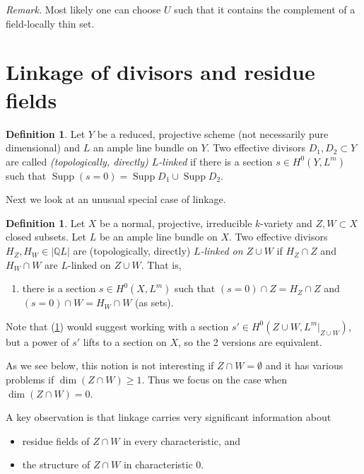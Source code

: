 \documentclass{amsart}
\theoremstyle{definition}
\newtheorem{defn}[thm]{Definition}
\theoremstyle{remark}
\newcommand{\q}[0]{{\mathbb Q}}
\newcommand{\supp}[0]{\operatorname{Supp}}
\begin{document}
{\it Remark.} Most likely one can choose  
$U$ such that it  contains the complement of a field-locally thin set. 
\medskip













\section{Linkage of divisors and residue fields}\label{link.divs.res.sect}



\begin{defn}\label{t-link.gen.defn} Let $Y$ be a reduced, projective scheme (not necessarily pure dimensional) and $L$ an ample line bundle on $Y$.  
Two effective divisors $D_1, D_2\subset Y$ are called  {\it (topologically, directly)  $L$-linked} if there is a section $s\in H^0(Y, L^m)$ such that
$\supp (s=0)=\supp D_1\cup \supp D_2$. 
\end{defn}

Next we look at an unusual special case of linkage.


\begin{defn}  \label{t-link.ZW.defn}
Let $X$ be a  normal, projective, irreducible  $k$-variety and
$Z, W\subset X$ closed subsets. Let $L$ be an ample line bundle on $X$. Two effective divisors  $H_Z, H_W\in |\q L|$ are (topologically, directly)  {\it $L$-linked on $Z\cup W$} if  $H_Z\cap Z$ and $H_W\cap W$
are  $L$-linked on $Z\cup W$. That is, 
\begin{enumerate}
\item there is a section $s\in H^0(X, L^m)$ such that
$(s=0)\cap Z=H_Z\cap Z$ and $(s=0)\cap W=H_W\cap W$ (as sets).
\end{enumerate}
Note that (\ref{t-link.gen.defn}) would suggest working with a section
$s'\in H^0(Z\cup W, L^m|_{Z\cup W})$, but a power of $s'$ lifts to a section on $X$, so the 2 versions are equivalent.

As we see below, this notion is not interesting if $Z\cap W=\emptyset$
and it has various problems if $\dim (Z\cap W)\geq 1$. Thus we focus on the case when  $\dim (Z\cap W)=0$.





A key observation is that linkage  carries very significant information about \begin{itemize}
\item  residue fields of  $Z\cap W$ in every characteristic, and 
\item the structure of $Z\cap W$ in characteristic 0. 
\end{itemize}
\end{defn}
\end{document}
